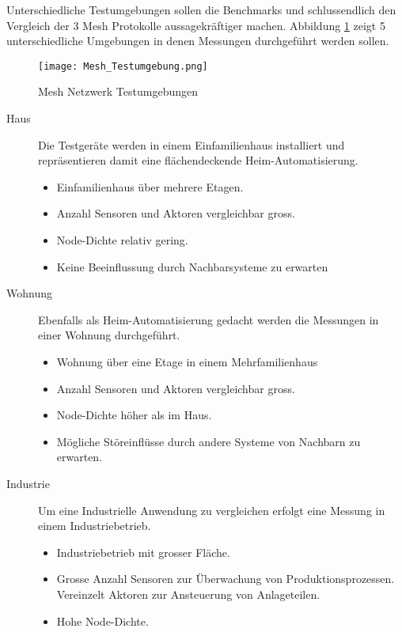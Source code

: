 Unterschiedliche Testumgebungen sollen die Benchmarks und schlussendlich den Vergleich der 3 Mesh Protokolle aussagekräftiger machen. Abbildung \ref{fig:MeshNetzwerkTestumgebungen} zeigt 5 unterschiedliche Umgebungen in denen Messungen durchgeführt werden sollen.

\begin{figure}[H]
	\centering
	\texttt{[image: Mesh\_Testumgebung.png]}
	\caption{Mesh Netzwerk Testumgebungen}\label{fig:MeshNetzwerkTestumgebungen}
\end{figure}

\begin{description}
\item[Haus] Die Testgeräte werden in einem Einfamilienhaus installiert und repräsentieren damit eine flächendeckende Heim-Automatisierung.
	\begin{itemize}
		\item Einfamilienhaus über mehrere Etagen.
		\item Anzahl Sensoren und Aktoren vergleichbar gross.
		\item Node-Dichte relativ gering.
		\item Keine Beeinflussung durch Nachbarsysteme zu erwarten \hfill \\
	\end{itemize}
\item[Wohnung] Ebenfalls als Heim-Automatisierung gedacht werden die Messungen in einer Wohnung durchgeführt.
	\begin{itemize}
		\item Wohnung über eine Etage in einem Mehrfamilienhaus
		\item Anzahl Sensoren und Aktoren vergleichbar gross.
		\item Node-Dichte höher als im Haus.
		\item Mögliche Störeinflüsse durch andere Systeme von Nachbarn zu 					erwarten. \hfill \\
	\end{itemize}
\item[Industrie] Um eine Industrielle Anwendung zu vergleichen erfolgt eine Messung in einem Industriebetrieb.
	\begin{itemize}
		\item Industriebetrieb mit grosser Fläche.
		\item Grosse Anzahl Sensoren zur Überwachung von Produktionsprozessen. 				Vereinzelt Aktoren zur Ansteuerung von Anlageteilen.
		\item Hohe Node-Dichte.

\end{itemize}
\end{description}

